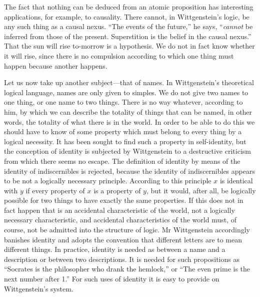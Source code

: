\documentclass[12pt,oneside]{book}[2007/10/19]
\begin{document}
The fact that nothing can be deduced from an atomic
proposition has interesting applications, for example, to
causality. There cannot, in Wittgenstein's logic, be any
such thing as a causal nexus. ``The events of the future,''
he says, ``\emph{cannot} be inferred from those of the present.
Superstition is the belief in the causal nexus.'' That the
sun will rise to-morrow is a hypothesis. We do not in
fact know whether it will rise, since there is no compulsion
according to which one thing must happen because another
happens.

Let us now take up another subject---that of names.
In Wittgenstein's theoretical logical language, names are
only given to simples. We do not give two names to
one thing, or one name to two things. There is no way
whatever, according to him, by which we can describe
the totality of things that can be named, in other words,
the totality of what there is in the world. In order to be
able to do this we should have to know of some property
which must belong to every thing by a logical necessity.
It has been sought to find such a property in self-identity,
but the conception of identity is subjected by Wittgenstein
to a destructive criticism from which there seems no escape.
The definition of identity by means of the identity of indiscernibles
is rejected, because the identity of indiscernibles
appears to be not a logically necessary principle. According
to this principle $x$ is identical with $y$ if every property
of $x$ is a property of $y$, but it would, after all, be logically
possible for two things to have exactly the same properties.
If this does not in fact happen that is an accidental
characteristic of the world, not a logically necessary
characteristic, and accidental characteristics of the world
must, of course, not be admitted into the structure of
logic. Mr Wittgenstein accordingly banishes identity
and adopts the convention that different letters are to
mean different things. In practice, identity is needed as
between a name and a description or between two descriptions.
It is needed for such propositions as ``Socrates
is the philosopher who drank the hemlock,'' or ``The
even prime is the next number after 1.'' For such uses
of identity it is easy to provide on Wittgenstein's system.
\end{document}
